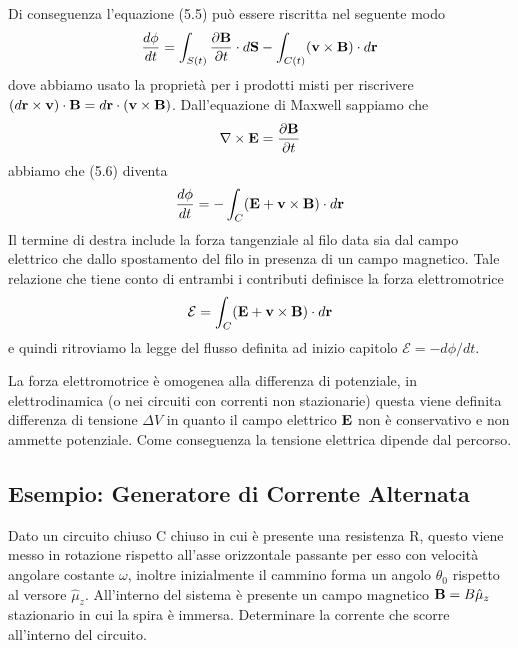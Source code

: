 Di conseguenza l'equazione (5.5) pu\`o essere riscritta nel seguente modo
\begin{equation}
	\frac{d\phi }{dt } = \int_{S(t)}\frac{\partial \bold{B}}{\partial t} \cdot d\bold{S} - \int_{C(t)}(\bold{v} \times \bold{B})\cdot d\bold{r}
\end{equation}
dove abbiamo usato la propriet\`a per i prodotti misti per riscrivere $(d\bold{r} \times \bold{v} ) \cdot \bold{B} = d\bold{r} \cdot (\bold{v} \times \bold{B})$. Dall'equazione di Maxwell sappiamo che 
\begin{equation*}
	\nabla \times \bold{E} = \frac{\partial \bold{B}}{\partial t} 
\end{equation*}
abbiamo che (5.6) diventa 
\begin{equation*}
	\frac{d\phi}{dt} = - \int_{C} (\bold{E}+\bold{v} \times \bold{B}) \cdot d\bold{r} 
\end{equation*}
Il termine di destra include la forza tangenziale al filo data sia dal campo elettrico che dallo spostamento del filo in presenza di un campo magnetico. Tale relazione che tiene conto di entrambi i contributi definisce la forza elettromotrice 
\begin{equation}
	\mathcal{E} = \int_{C}(\bold{E} + \bold{v} \times \bold{B}) \cdot d \bold{r}
\end{equation}
e quindi ritroviamo la legge del flusso definita ad inizio capitolo $\mathcal{E} = - d\phi /dt$.

La forza elettromotrice \`e omogenea alla differenza di potenziale, in elettrodinamica (o nei circuiti con correnti non stazionarie) questa viene definita differenza di tensione $\Delta V$ in quanto il campo elettrico $\bold{E}$ non \`e conservativo e non ammette potenziale. Come conseguenza la tensione elettrica dipende dal percorso.

\subsection{Esempio: Generatore di Corrente Alternata }
Dato un circuito chiuso C chiuso in cui \`e presente una resistenza R, questo viene messo in rotazione rispetto all'asse orizzontale passante per esso con velocit\`a angolare costante $\omega$, inoltre inizialmente il cammino forma un angolo $\theta_0$ rispetto al versore $\hat{\mu}_z$. All'interno del sistema \`e presente un campo magnetico $\bold{B} = B \hat{\mu}_z$ stazionario in cui la spira \`e immersa. Determinare la corrente che scorre all'interno del circuito.

